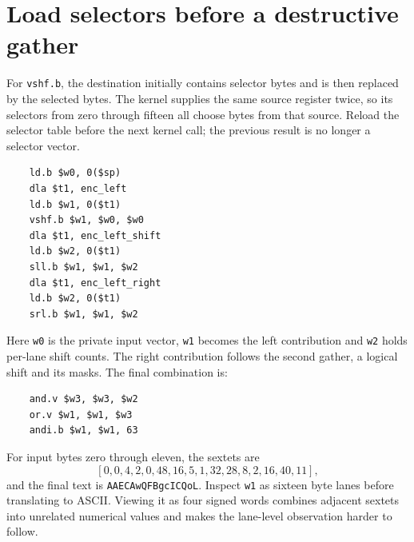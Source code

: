 \section{Load selectors before a destructive gather}
For \texttt{vshf.b}, the destination initially contains selector bytes and is then
replaced by the selected bytes. The kernel supplies the same source register twice,
so its selectors from zero through fifteen all choose bytes from that source. Reload
the selector table before the next kernel call; the previous result is no longer a
selector vector.

\begin{verbatim}
    ld.b $w0, 0($sp)
    dla $t1, enc_left
    ld.b $w1, 0($t1)
    vshf.b $w1, $w0, $w0
    dla $t1, enc_left_shift
    ld.b $w2, 0($t1)
    sll.b $w1, $w1, $w2
    dla $t1, enc_left_right
    ld.b $w2, 0($t1)
    srl.b $w1, $w1, $w2
\end{verbatim}

Here \texttt{w0} is the private input vector, \texttt{w1} becomes the left contribution
and \texttt{w2} holds per-lane shift counts. The right contribution follows the second
gather, a logical shift and its masks. The final combination is:

\begin{verbatim}
    and.v $w3, $w3, $w2
    or.v $w1, $w1, $w3
    andi.b $w1, $w1, 63
\end{verbatim}

For input bytes zero through eleven, the sextets are
\[
  [0,0,4,2,0,48,16,5,1,32,28,8,2,16,40,11],
\]
and the final text is \texttt{AAECAwQFBgcICQoL}. Inspect \texttt{w1} as sixteen byte
lanes before translating to ASCII. Viewing it as four signed words combines adjacent
sextets into unrelated numerical values and makes the lane-level observation harder
to follow.
